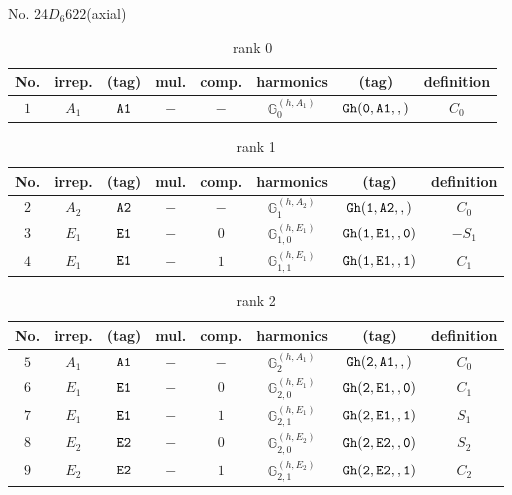 \documentclass[fleqn,8pt]{jsarticle}
\begin{document}
\setcounter{MaxMatrixCols}{16}

\begin{center}
\LARGE
No. 24\quad$D_{6}$\quad$622$\quad[ hexagonal ] (axial)
\end{center}
\begin{table}[ht!]
\begin{center}
\caption{rank 0}
\renewcommand{\arraystretch}{1.3}
\begin{tabular}{cccccccc} \hline \hline
No. & irrep. & (tag) & mul. & comp. & harmonics & (tag) & definition \\ \hline
$ 1 $ & $ A_{1} $ & $ {\tt A1} $ & $ - $ & $ - $ & $ \mathbb{G}_{0}^{(h,A_{1})} $ & $ {\tt Gh(0,A1,,)} $ & $ C_{0} $ \\
 \hline \hline
\end{tabular}
\end{center}
\end{table}
\begin{table}[ht!]
\begin{center}
\caption{rank 1}
\renewcommand{\arraystretch}{1.3}
\begin{tabular}{cccccccc} \hline \hline
No. & irrep. & (tag) & mul. & comp. & harmonics & (tag) & definition \\ \hline
$ 2 $ & $ A_{2} $ & $ {\tt A2} $ & $ - $ & $ - $ & $ \mathbb{G}_{1}^{(h,A_{2})} $ & $ {\tt Gh(1,A2,,)} $ & $ C_{0} $ \\
$ 3 $ & $ E_{1} $ & $ {\tt E1} $ & $ - $ & $ 0 $ & $ \mathbb{G}_{1,0}^{(h,E_{1})} $ & $ {\tt Gh(1,E1,,0)} $ & $ - S_{1} $ \\
$ 4 $ & $ E_{1} $ & $ {\tt E1} $ & $ - $ & $ 1 $ & $ \mathbb{G}_{1,1}^{(h,E_{1})} $ & $ {\tt Gh(1,E1,,1)} $ & $ C_{1} $ \\
 \hline \hline
\end{tabular}
\end{center}
\end{table}
\begin{table}[ht!]
\begin{center}
\caption{rank 2}
\renewcommand{\arraystretch}{1.3}
\begin{tabular}{cccccccc} \hline \hline
No. & irrep. & (tag) & mul. & comp. & harmonics & (tag) & definition \\ \hline
$ 5 $ & $ A_{1} $ & $ {\tt A1} $ & $ - $ & $ - $ & $ \mathbb{G}_{2}^{(h,A_{1})} $ & $ {\tt Gh(2,A1,,)} $ & $ C_{0} $ \\
$ 6 $ & $ E_{1} $ & $ {\tt E1} $ & $ - $ & $ 0 $ & $ \mathbb{G}_{2,0}^{(h,E_{1})} $ & $ {\tt Gh(2,E1,,0)} $ & $ C_{1} $ \\
$ 7 $ & $ E_{1} $ & $ {\tt E1} $ & $ - $ & $ 1 $ & $ \mathbb{G}_{2,1}^{(h,E_{1})} $ & $ {\tt Gh(2,E1,,1)} $ & $ S_{1} $ \\
$ 8 $ & $ E_{2} $ & $ {\tt E2} $ & $ - $ & $ 0 $ & $ \mathbb{G}_{2,0}^{(h,E_{2})} $ & $ {\tt Gh(2,E2,,0)} $ & $ S_{2} $ \\
$ 9 $ & $ E_{2} $ & $ {\tt E2} $ & $ - $ & $ 1 $ & $ \mathbb{G}_{2,1}^{(h,E_{2})} $ & $ {\tt Gh(2,E2,,1)} $ & $ C_{2} $ \\
 \hline \hline
\end{tabular}
\end{center}
\end{table}
\end{document}

